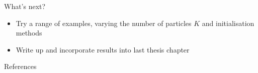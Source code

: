 \documentclass{beamer}
\begin{document}
\begin{frame}{What's next?}
\begin{itemize}
\item Try a range of examples, varying the number of particles $K$ and initialisation methods
\item Write up and incorporate results into last thesis chapter
\end{itemize}
\end{frame}

\begin{frame}{References}


\end{frame}
\end{document}
